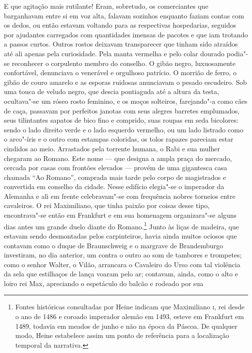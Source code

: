 E que agitação mais rutilante! Eram, sobretudo, os comerciantes que
barganhavam entre si em voz alta, falavam sozinhos enquanto faziam
contas com os dedos, ou então estavam voltando para as respectivas
hospedarias, seguidos por ajudantes carregados com quantidades imensas
de pacotes e que iam trotando a passos curtos. Outros rostos deixavam
transparecer que tinham sido atraídos até ali apenas pela curiosidade.
Pela manta vermelha e pelo colar dourado podia"-se reconhecer o
corpulento membro do conselho. O gibão negro, luxuosamente confortável,
denunciava o venerável e orgulhoso patrício. O morrião de ferro, o
gibão de couro amarelo e as esporas ruidosas anunciavam o pesado
escudeiro. Sob uma touca de veludo negro, que descia pontiaguda até a
altura da testa, ocultava"-se um róseo rosto feminino, e os moços
solteiros, farejando"-a como cães de caça, passavam por perfeitos
janotas com seus alegres barretes emplumados, seus tilintantes sapatos
de bico fino e comprido, suas roupas em seda bicolores: sendo o lado
direito verde e o lado esquerdo vermelho, ou um lado listrado como o
arco"-íris e o outro com estampas coloridas, os tolos rapazes pareciam
estar cindidos ao meio. Arrastados pela torrente humana, o Rabi e sua
mulher chegaram ao Romano. Este nome --- que designa a ampla praça do
mercado, cercada por casas com frontões elevados --- provém de uma
gigantesca casa chamada ``Ao Romano'', comprada mais tarde pelo corpo de
magistrados e convertida em conselho da cidade. Nesse edifício
elegia"-se o imperador da Alemanha e ali em frente celebravam"-se com
frequência nobres torneios entre cavaleiros. O rei Maximiliano, que
tinha paixão por coisas desse tipo, encontrava"-se então em Frankfurt
e em sua homenagem organizara"-se alguns dias antes um grande duelo
diante do Romano.\footnote{
Fontes históricas consultadas por Heine indicam que Maximiliano \textsc{i}, rei
desde o ano de 1486 e coroado imperador alemão em 1493, esteve em
Frankfurt em 1489, todavia em meados de junho e não na época da Páscoa.
De qualquer modo, Heine estabelece assim um ponto de referência para a
localização temporal da narrativa.}
Junto às liças de madeira, que estavam sendo desmontadas pelos
carpinteiros, havia ainda muitos ociosos que contavam como o duque de
Braunschweig e o margrave de Brandemburgo investiram, no dia anterior,
um contra o outro ao som de tambores e trompetes; como o senhor Walter,
o Vilão, arrancara o Cavaleiro do Urso com tal violência da sela que
estilhaços de lança voaram pelo ar; contavam, ainda, como o alto e
loiro rei Max, apreciando o espetáculo do balcão e rodeado por sua
